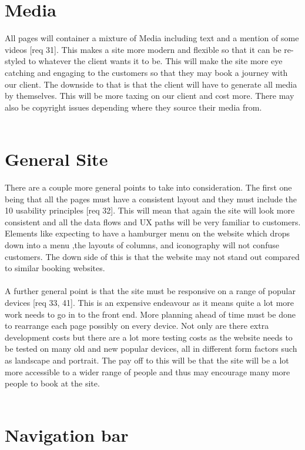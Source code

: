 \documentclass{article}
\begin{document}
\section{Media}

All pages will container a mixture of Media including text and a mention of some videos [req 31]. This makes a site more modern and flexible so that it can be re-styled to whatever the client wants it to be. This will make the site more eye catching and engaging to the customers so that they may book a journey with our client. 
The downside to that is that the client will have to generate all media by themselves. This will be more taxing on our client and cost more. There may also be copyright issues depending where they source their media from.
\\
\\
\section{General Site}

There are a couple more general points to take into consideration. The first one being that all the pages must have a consistent layout and they must include the 10 usability principles [req 32]. This will mean that again the site will look more consistent and all the data flows and UX paths will be very familiar to customers. Elements like expecting to have a hamburger menu on the website which drops down into a menu ,the layouts of columns, and iconography will not confuse customers. The down side of this is that the website may not stand out compared to similar booking websites.
\\
\\
A further general point is that the site must be responsive on a range of popular devices [req 33, 41]. This is an expensive endeavour as it means quite a lot more work needs to go in to the front end. More planning ahead of time must be done to rearrange each page possibly on every device. Not only are there extra development costs but there are a lot more testing costs as the website needs to be tested on many old and new popular devices, all in different form factors such as landscape and portrait. The pay off to this will be that the site will be a lot more accessible to a wider range of people and thus may encourage many more people to book at the site.
\\
\\

\section{Navigation bar}
\end{document}
